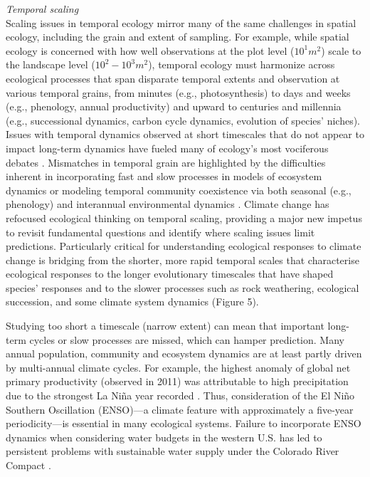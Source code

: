 \documentclass[11pt,a4paper,oneside]{article}
\begin{document}
\noindent \emph{Temporal scaling}\\ 
\noindent Scaling issues in temporal ecology mirror many of the same challenges in spatial ecology, including the grain and extent of sampling. For example, while spatial ecology is concerned with how well observations at the plot level ($10^{1}m^2$) scale to the landscape level ($10^{2}-10^{3}m^2$), temporal ecology must harmonize across ecological processes that span disparate temporal extents and observation at various temporal grains, from minutes (e.g., photosynthesis) to days and weeks (e.g., phenology, annual productivity) and upward to centuries and millennia (e.g., successional dynamics, carbon cycle dynamics, evolution of species' niches). Issues with temporal dynamics observed at short timescales that do not appear to impact long-term dynamics have fueled many of ecology's most vociferous debates \citep{wiens1986}. Mismatches in temporal grain are highlighted by the difficulties inherent in incorporating fast and slow processes in models of ecosystem dynamics \citep{Carpenter2000} or modeling temporal community coexistence via both seasonal (e.g., phenology) and interannual environmental dynamics \citep{Chesson:1997dz}. Climate change has refocused ecological thinking on temporal scaling, providing a major new impetus to revisit fundamental questions and identify where scaling issues limit predictions. Particularly critical for understanding ecological responses to climate change is bridging from the shorter, more rapid temporal scales that characterise ecological responses to the longer evolutionary timescales that have shaped species' responses and to the slower processes such as rock weathering, ecological succession, and some climate system dynamics (Figure 5). 

Studying too short a timescale (narrow extent) can mean that important long-term cycles or slow processes are missed, which can hamper prediction. Many annual population, community and ecosystem dynamics are at least partly driven by multi-annual climate cycles. For example, the highest anomaly of global net primary productivity (observed in 2011) was attributable to high precipitation due to the strongest La Ni\~na year recorded \citep{bastos2013}. Thus, consideration of the El Ni\~no Southern Oscillation (ENSO)---a climate feature with approximately a five-year periodicity---is essential in many ecological systems. Failure to incorporate ENSO dynamics when considering water budgets in the western U.S. has led to persistent problems with sustainable water supply under the Colorado River Compact \citep{Christensen2004}. 
\end{document}
